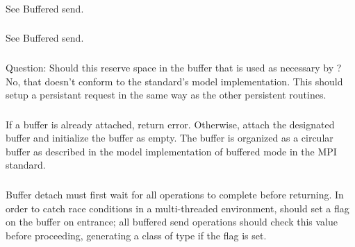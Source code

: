 \documentclass{article}
\begin{document}
\subsubsection{}
See Buffered send.

\subsubsection{}
See Buffered send.

\subsubsection{}
Question:  Should this reserve space in the buffer that is used as
necessary by ?  No, that doesn't conform to the
standard's model implementation.  This should setup a persistant
request in the same way as the other persistent routines.

\subsubsection{}
\begin{adi3}
If a buffer is already attached, return error.
Otherwise, attach the designated buffer and initialize the buffer as empty.
The buffer is organized as a circular buffer as described in the model
implementation of buffered mode in the MPI standard.
\end{adi3}

\subsubsection{}
Buffer detach must first wait for all operations to complete before
returning.  
In order to catch race conditions in a multi-threaded environment, 
 should set a flag on the buffer on entrance; all
buffered send operations should check this value before proceeding, generating
a  class of type  if the flag is
set.
\end{document}
